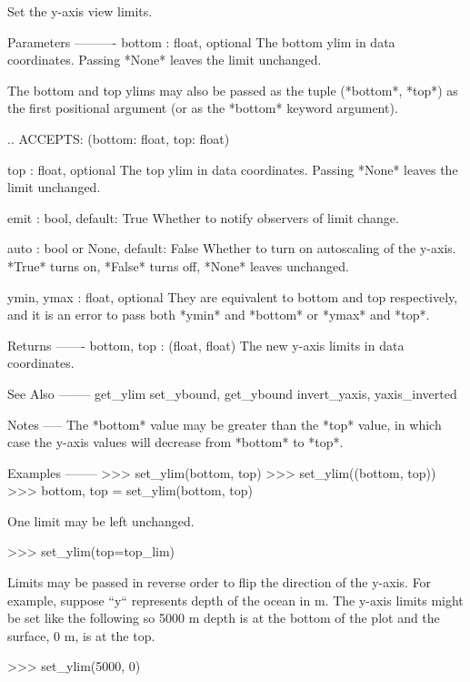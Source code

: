 \begin{DoxyVerb}Set the y-axis view limits.

Parameters
----------
bottom : float, optional
    The bottom ylim in data coordinates. Passing *None* leaves the
    limit unchanged.

    The bottom and top ylims may also be passed as the tuple
    (*bottom*, *top*) as the first positional argument (or as
    the *bottom* keyword argument).

    .. ACCEPTS: (bottom: float, top: float)

top : float, optional
    The top ylim in data coordinates. Passing *None* leaves the
    limit unchanged.

emit : bool, default: True
    Whether to notify observers of limit change.

auto : bool or None, default: False
    Whether to turn on autoscaling of the y-axis. *True* turns on,
    *False* turns off, *None* leaves unchanged.

ymin, ymax : float, optional
    They are equivalent to bottom and top respectively,
    and it is an error to pass both *ymin* and *bottom* or
    *ymax* and *top*.

Returns
-------
bottom, top : (float, float)
    The new y-axis limits in data coordinates.

See Also
--------
get_ylim
set_ybound, get_ybound
invert_yaxis, yaxis_inverted

Notes
-----
The *bottom* value may be greater than the *top* value, in which
case the y-axis values will decrease from *bottom* to *top*.

Examples
--------
>>> set_ylim(bottom, top)
>>> set_ylim((bottom, top))
>>> bottom, top = set_ylim(bottom, top)

One limit may be left unchanged.

>>> set_ylim(top=top_lim)

Limits may be passed in reverse order to flip the direction of
the y-axis. For example, suppose ``y`` represents depth of the
ocean in m. The y-axis limits might be set like the following
so 5000 m depth is at the bottom of the plot and the surface,
0 m, is at the top.

>>> set_ylim(5000, 0)
\end{DoxyVerb}
 \mbox{\label{classmatplotlib_1_1axes_1_1__base_1_1__AxesBase_a8a74d543c4b549205cea2b8c94664f98}} 
